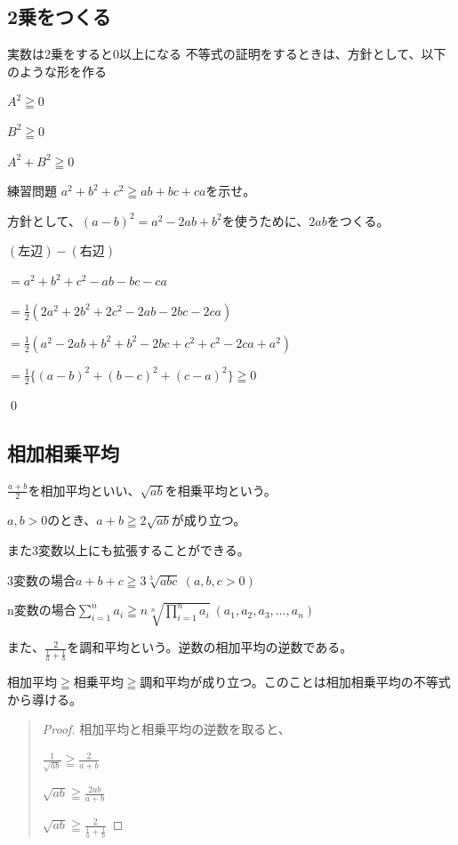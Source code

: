 \documentclass[uplatex,fleqn]{jsbook}
\begin{document}
\subsection{2乗をつくる}
実数は2乗をすると0以上になる
不等式の証明をするときは、方針として、以下のような形を作る

$A^2\geqq 0$

$B^2\geqq 0$

$A^2+B^2\geqq 0$

\begin{problem}{練習問題}
    $a^2+b^2+c^2\geqq ab+bc+ca$を示せ。
\end{problem}

\begin{answer}
    方針として、$\left(a- b\right)^2=a^2-2ab+b^2$を使うために、$2ab$をつくる。

    $\left(\text{左辺}\right)-\left(\text{右辺}\right)$

    $=a^2+b^2+c^2-ab-bc-ca$

    $\displaystyle =\frac{1}{2}\left(2a^2+2b^2+2c^2-2ab-2bc-2ca\right)$

    $\displaystyle =\frac{1}{2}\left(a^2-2ab+b^2+b^2-2bc+c^2+c^2-2ca+a^2\right)$

    $\displaystyle =\frac{1}{2}\{\left(a-b\right)^2+\left(b-c\right)^2+\left(c-a\right)^2\}\geqq 0$

    \qed
\end{answer}

\subsection{相加相乗平均}
$\displaystyle \frac{a+b}{2}$を相加平均といい、$\sqrt{ab}$を相乗平均という。

$a,b>0$のとき、$a+b\geqq2\sqrt{ab}$が成り立つ。

また3変数以上にも拡張することができる。

3変数の場合$a+b+c\geqq 3\sqrt[3]{abc}\ \left(a,b,c>0\right)$

n変数の場合$\displaystyle \sum_{i=1}^n a_i\geqq n\sqrt[n]{\prod_{i=1}^n a_i}\ \left(a_1,a_2,a_3,\dots,a_n\right)$

また、$\displaystyle \frac{2}{\frac{1}{a}+\frac{1}{b}}$を調和平均という。逆数の相加平均の逆数である。

相加平均$\geqq$相乗平均$\geqq$調和平均が成り立つ。このことは相加相乗平均の不等式から導ける。
\begin{quote}
    \begin{proof}
        相加平均と相乗平均の逆数を取ると、

        $\displaystyle \frac{1}{\sqrt{ab}}\geqq\frac{2}{a+b}$

        $\displaystyle \sqrt{ab}\geqq\frac{2ab}{a+b}$

        $\displaystyle \sqrt{ab}\geqq\frac{2}{\frac{1}{a}+\frac{1}{b}}$
    \end{proof}
\end{quote}
\end{document}
